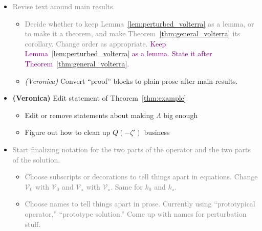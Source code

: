 \documentclass{article}
\theoremstyle{plain}
\newcommand{\volterra}{\mathcal{V}}
\newcommand{\hardpart}{\mathcal{V}_0}
\newcommand{\softpart}{\mathcal{V}_\star}
\newcommand{\hardker}{k_0}
\newcommand{\softker}{k_\star}
\newenvironment{brainstorm}{\color{violet}\begin{itemize}}{\end{itemize}\color{black}}
\begin{document}
\begin{brainstorm}
\begin{itemize}
        \color{gray}
        \item \textit{(Veronica)} Add motivation to Section~\ref{sec:image under soft_part}, explaining that the desired result of the section follows from a more general result about the smoothing effect of $\softpart$ (Proposition~\ref{prop:smoothing}). \textcolor{green}{I added a Corollary to explicitly write how Proposition \ref{prop:smoothing} implies the regularity we want for $\softpart f_0$}
        \color{violet}
        \item \textbf{(Aaron)} Confirm again that removed $\tau+\gamma$ upper bound on $\rho$ was unnecessary.
\end{itemize}
\item \textcolor{gray}{Revise text around main results.}
\begin{itemize}
    \item \textcolor{gray}{Decide whether to keep Lemma~\ref{lem:perturbed_volterra} as a lemma, or to make it a theorem, and make Theorem~\ref{thm:general_volterra} its corollary. Change order as appropriate.} \textcolor{purple}{Keep Lemma~\ref{lem:perturbed_volterra} as a lemma. State it after Theorem~\ref{thm:general_volterra}.}
    \color{gray}
    \item \textit{(Veronica)} Convert ``proof'' blocks to plain prose after main results. 
\end{itemize}
\color{gray}
\item \textbf{(Veronica)} Edit statement of Theorem~\ref{thm:example} 
\begin{itemize}
    \item Edit or remove statements about making $\Lambda$ big enough
    \item Figure out how to clean up $Q(-\zeta')$ business
\end{itemize}
\color{violet}
\item \textcolor{gray}{Start finalizing notation for the two parts of the operator and the two parts of the solution.}
\begin{itemize}
    \item \textcolor{gray}{Choose subscripts or decorations to tell things apart in equations.} \textcolor{gray}{Change $\hardpart$ with $\volterra_0$ and $\softpart$ with $\volterra_\star$. Same for $\hardker$ and $\softker$.}
    \item \textcolor{gray}{Choose names to tell things apart in prose. Currently using ``prototypical operator,'' ``prototype solution.'' Come up with names for perturbation stuff.}
\end{itemize}

\end{brainstorm}
\end{document}
